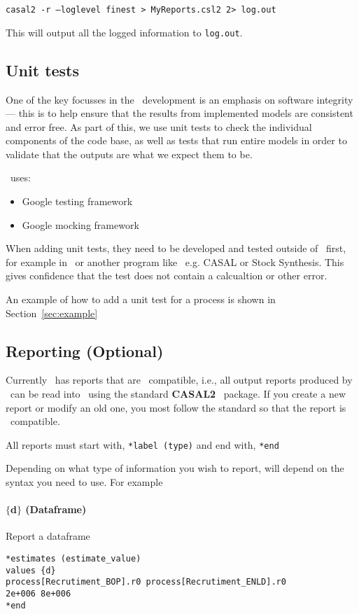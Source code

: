 \texttt{casal2 -r --loglevel finest > MyReports.csl2 2> log.out}

This will output all the logged information to \texttt{log.out}.

\subsection{Unit tests}

One of the key focusses in the \CNAME\ development is an emphasis on software integrity --- this is to help ensure that the results from implemented models are consistent and error free. As part of this, we use unit tests to check the individual components of the code base, as well as tests that run entire models in order to validate that the outputs are what we expect them to be.

\CNAME\ uses:
\begin{itemize}
	\item Google testing framework
	\item Google mocking framework
\end{itemize}

When adding unit tests, they need to be developed and tested outside of \CNAME\  first, for example in \R\ or another program like \CNAME\ e.g. CASAL or Stock Synthesis. This gives confidence that the test does not contain a calcualtion or other error. 

An example of how to add a unit test for a process is shown in Section~\ref{sec:example}

\subsection{Reporting (Optional)}

Currently \CNAME\ has reports that are \R\ compatible, i.e., all output reports produced by \CNAME\ can be read into \R\ using the standard  \textbf{CASAL2} \R\ package. If you create a new report or modify an old one, you most follow the standard so that the report is \R\ compatible.

All reports must start with,
\texttt{*label (type)}
and end with,
\texttt{*end}

Depending on what type of information you wish to report, will depend on the syntax you need to use. For example

\paragraph*{$\{$d$\}$ (Dataframe)}
Report a dataframe
{\small{\begin{verbatim}
*estimates (estimate_value)
values {d}
process[Recrutiment_BOP].r0 process[Recrutiment_ENLD].r0 
2e+006 8e+006
*end
\end{verbatim}}}

